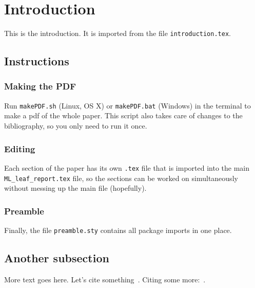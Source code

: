 \section{Introduction}
This is the introduction.
It is imported from the file \verb+introduction.tex+.

\subsection{Instructions}
\subsubsection{Making the PDF}
Run \verb+makePDF.sh+ (Linux, OS X) or \verb+makePDF.bat+ (Windows) in the terminal to make a pdf of the whole paper.
This script also takes care of changes to the bibliography, so you only need to run it once.

\subsubsection{Editing}
Each section of the paper has its own \verb+.tex+ file that is imported into the main \verb+ML_leaf_report.tex+ file, so the sections can be worked on simultaneously without messing up the main file (hopefully).

\subsubsection{Preamble}
Finally, the file \verb+preamble.sty+ contains all package imports in one place.

\subsection{Another subsection}
More text goes here.
Let's cite something~\cite{dijkstra68}.
Citing some more:~\cite{charniak85,steels98}.
